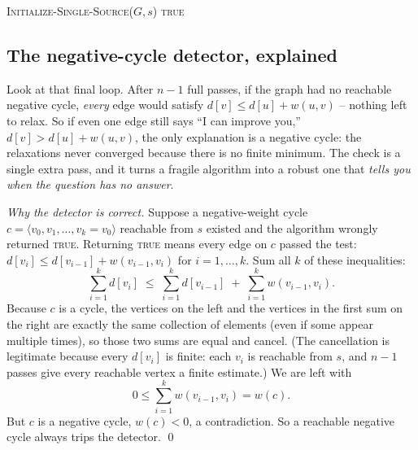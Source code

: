 \begin{algorithm}[H]
\caption{\textsc{Bellman-Ford}($G, w, s$)}
\textsc{Initialize-Single-Source}($G,s$)\;
\Return \textsc{true}\;
\end{algorithm}

\subsection{The negative-cycle detector, explained}

Look at that final loop. After $n-1$ full passes, if the graph had no reachable
negative cycle, \emph{every} edge would satisfy $d[v] \le d[u]+w(u,v)$ -- nothing
left to relax. So if even one edge still says ``I can improve you,''
$d[v] > d[u]+w(u,v)$, the only explanation is a negative cycle: the relaxations
never converged because there is no finite minimum. The check is a single extra
pass, and it turns a fragile algorithm into a robust one that \emph{tells you when
the question has no answer}.

\begin{formalbox}
\emph{Why the detector is correct.} Suppose a negative-weight cycle
$c = \langle v_0, v_1, \dots, v_k = v_0\rangle$ reachable from $s$ existed and the
algorithm wrongly returned \textsc{true}. Returning \textsc{true} means every edge
on $c$ passed the test: $d[v_i] \le d[v_{i-1}] + w(v_{i-1},v_i)$ for
$i=1,\dots,k$. Sum all $k$ of these inequalities:
\[
\sum_{i=1}^{k} d[v_i] \;\le\; \sum_{i=1}^{k} d[v_{i-1}] \;+\; \sum_{i=1}^{k} w(v_{i-1},v_i).
\]
Because $c$ is a cycle, the vertices on the left and the vertices in the first sum
on the right are exactly the same collection of elements (even if some appear multiple times), so those two sums are equal and cancel. (The
cancellation is legitimate because every $d[v_i]$ is finite: each $v_i$ is
reachable from $s$, and $n-1$ passes give every reachable vertex a finite
estimate.) We are
left with
\[
0 \le \sum_{i=1}^{k} w(v_{i-1},v_i) = w(c).
\]
But $c$ is a negative
cycle, $w(c) < 0$, a contradiction. So a reachable negative cycle always trips the
detector. \qed
\end{formalbox}

